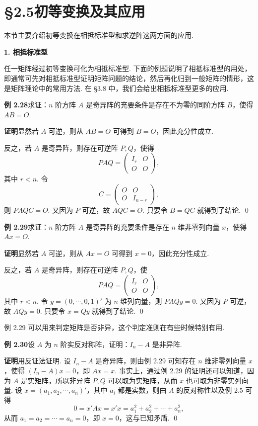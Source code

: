 \documentclass[UTF8,12pt,a4paper,fontset=fandol]{ctexart}
\begin{document}
\section*{§2.5\quad 初等变换及其应用}

本节主要介绍初等变换在相抵标准型和求逆阵这两方面的应用.

\noindent\textbf{1. 相抵标准型}

任一矩阵经过初等变换可化为相抵标准型. 下面的例题说明了相抵标准型的用处，即通常可先对相抵标准型证明矩阵问题的结论，然后再化归到一般矩阵的情形，这是矩阵理论中的常用方法. 在 §3.8 中，我们会给出相抵标准型更多的应用.

\noindent\textbf{例 2.28}\quad 求证：$n$ 阶方阵 $A$ 是奇异阵的充要条件是存在不为零的同阶方阵 $B$，使得 $AB=O$.

\noindent\textbf{证明}\quad 显然若 $A$ 可逆，则从 $AB=O$ 可得到 $B=O$，因此充分性成立.

反之，若 $A$ 是奇异阵，则存在可逆阵 $P,Q$，使得
\[
PAQ=
\left(
\begin{array}{cc}
I_r & O\\
O & O
\end{array}
\right),
\]
其中 $r<n$. 令
\[
C=
\left(
\begin{array}{cc}
O & O\\
O & I_{n-r}
\end{array}
\right),
\]
则 $PAQC=O$. 又因为 $P$ 可逆，故 $AQC=O$. 只要令 $B=QC$ 就得到了结论. \qed

\noindent\textbf{例 2.29}\quad 求证：$n$ 阶方阵 $A$ 是奇异阵的充要条件是存在 $n$ 维非零列向量 $x$，使得 $Ax=O$.

\noindent\textbf{证明}\quad 显然若 $A$ 可逆，则从 $Ax=O$ 可得到 $x=0$，因此充分性成立.

反之，若 $A$ 是奇异阵，则存在可逆阵 $P,Q$，使
\[
PAQ=
\left(
\begin{array}{cc}
I_r & O\\
O & O
\end{array}
\right),
\]
其中 $r<n$. 令 $y=(0,\cdots,0,1)'$ 为 $n$ 维列向量，则 $PAQy=0$. 又因为 $P$ 可逆，故 $AQy=0$. 只要令 $x=Qy$ 就得到了结论. \qed

例 2.29 可以用来判定矩阵是否非异，这个判定准则在有些时候特别有用.

\noindent\textbf{例 2.30}\quad 设 $A$ 为 $n$ 阶实反对称阵，证明：$I_n-A$ 是非异阵.

\noindent\textbf{证明}\quad 用反证法证明. 设 $I_n-A$ 是奇异阵，则由例 2.29 可知存在 $n$ 维非零列向量 $x$，使得 $(I_n-A)x=0$，即 $Ax=x$. 事实上，通过例 2.29 的证明还可以知道，因为 $A$ 是实矩阵，所以非异阵 $P,Q$ 可以取为实矩阵，从而 $x$ 也可取为非零实列向量. 设 $x=(a_1,a_2,\cdots,a_n)'$，其中 $a_i$ 都是实数，则由 $A$ 的反对称性以及例 2.5 可得
\[
0=x'Ax=x'x=a_1^2+a_2^2+\cdots+a_n^2,
\]
从而 $a_1=a_2=\cdots=a_n=0$，即 $x=0$，这与已知矛盾. \qed
\end{document}
